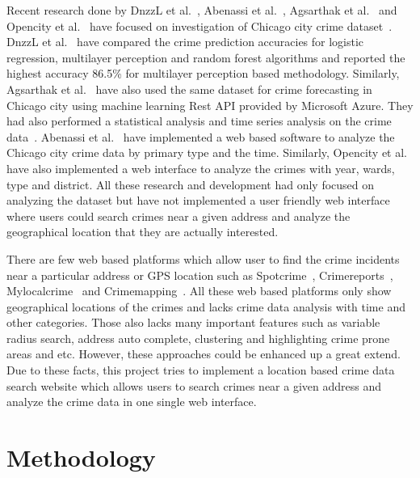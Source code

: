 Recent research done by DnzzL et al.~\cite{hid-sp18-409-dnzzl},
Abenassi et al.~\cite{hid-sp18-409-abenassi}, Agsarthak et
al.~\cite{hid-sp18-409-agsarthak} and Opencity et
al.~\cite{hid-sp18-409-open-city} have focused on investigation of
Chicago city crime dataset~\cite{hid-sp18-409-www-data.gov}.  DnzzL et
al.~\cite{hid-sp18-409-dnzzl} have compared the crime prediction
accuracies for logistic regression, multilayer perception and random
forest algorithms and reported the highest accuracy 86.5\% for
multilayer perception based methodology. Similarly, Agsarthak et
al.~\cite{hid-sp18-409-agsarthak} have also used the same dataset for
crime forecasting in Chicago city using machine learning Rest API
provided by Microsoft Azure. They had also performed a statistical
analysis and time series analysis on the crime
data~\cite{hid-sp18-409-agsarthak}. Abenassi et
al.~\cite{hid-sp18-409-abenassi} have implemented a web based software
to analyze the Chicago city crime data by primary type and the
time. Similarly, Opencity et al.~\cite{hid-sp18-409-open-city} have
also implemented a web interface to analyze the crimes with year,
wards, type and district. All these research and development had only
focused on analyzing the dataset but have not implemented a user
friendly web interface where users could search crimes near a given
address and analyze the geographical location that they are actually
interested.

There are few web based platforms which allow user to find the crime
incidents near a particular address or GPS location such as
Spotcrime~\cite{hid-sp18-409-www-spotcrime},
Crimereports~\cite{hid-sp18-409-www-crimereports},
Mylocalcrime~\cite{hid-sp18-409-www-mylocalcrime} and
Crimemapping~\cite{hid-sp18-409-www-crimemapping}. All these web based
platforms only show geographical locations of the crimes and lacks
crime data analysis with time and other categories. Those also lacks
many important features such as variable radius search, address auto
complete, clustering and highlighting crime prone areas and
etc. However, these approaches could be enhanced up a great extend.
Due to these facts, this project tries to implement a location based
crime data search website which allows users to search crimes near a
given address and analyze the crime data in one single web interface.

\section{Methodology}

